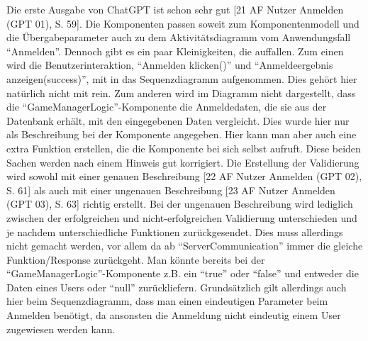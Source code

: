 Die erste Ausgabe von ChatGPT ist schon sehr gut [21 AF Nutzer Anmelden (GPT 01), S. 59]. Die Komponenten passen soweit zum Komponentenmodell und die Übergabeparameter auch 
zu dem Aktivitätsdiagramm vom Anwendungsfall ``Anmelden''. Dennoch gibt es ein paar Kleinigkeiten, die auffallen. Zum einen wird die 
Benutzerinteraktion, ``Anmelden klicken()'' und ``Anmeldeergebnis anzeigen(success)'', mit in das Sequenzdiagramm aufgenommen. Dies gehört 
hier natürlich nicht mit rein. Zum anderen wird im Diagramm nicht dargestellt, dass die ``GameManagerLogic''-Komponente die 
Anmeldedaten, die sie aus der Datenbank erhält, mit den eingegebenen Daten vergleicht. Dies wurde hier nur als Beschreibung bei der 
Komponente angegeben. Hier kann man aber auch eine extra Funktion erstellen, die die Komponente bei sich selbst aufruft. Diese beiden 
Sachen werden nach einem Hinweis gut korrigiert. Die Erstellung der Validierung wird sowohl mit einer genauen Beschreibung [22 AF Nutzer Anmelden (GPT 02), S. 61] 
als auch mit einer ungenauen Beschreibung [23 AF Nutzer Anmelden (GPT 03), S. 63] richtig erstellt. Bei der ungenauen Beschreibung wird lediglich zwischen der 
erfolgreichen und nicht-erfolgreichen Validierung unterschieden und je nachdem unterschiedliche Funktionen zurückgesendet. Dies muss 
allerdings nicht gemacht werden, vor allem da ab ``ServerCommunication'' immer die gleiche Funktion/Response zurückgeht. Man könnte 
bereits bei der ``GameManagerLogic''-Komponente z.B. ein ``true'' oder ``false'' und entweder die Daten eines Users oder ``null'' 
zurückliefern. Grundsätzlich gilt allerdings auch hier beim Sequenzdiagramm, dass man einen eindeutigen Parameter beim Anmelden 
benötigt, da ansonsten die Anmeldung nicht eindeutig einem User zugewiesen werden kann.

